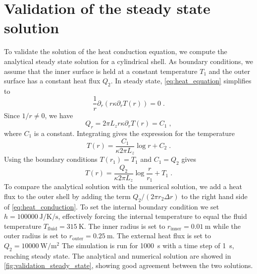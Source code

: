 \documentclass{article}
\begin{document}
\section{Validation of the steady state solution}
To validate the solution of the heat conduction equation, we compute the analytical steady state solution for a cylindrical shell. As boundary conditions, we assume that the inner surface is held at a constant temperature $T_{1}$ and the outer surface has a constant heat flux $Q_{2}$. In steady state, \cref{eq:heat_equation} simplifies to 
\begin{equation}
    \frac{1}{r}\partial_{r} \left( r \kappa \partial_{r} T\left( r \right) \right) = 0\;.
\end{equation}
Since $1/r \neq 0$, we have
\begin{equation}
  Q_{r} = 2 \pi L_{z} r \kappa \partial_{r} T\left( r \right) = C_{1}\;,
\end{equation}
where $C_{1}$ is a constant. Integrating gives the expression for the temperature
\begin{equation}
    T\left( r \right) = \frac{C_{1}}{\kappa 2\pi L_{z}} \log{r} + C_{2}\;.
\end{equation}
Using the boundary conditions $T\left( r_{1} \right) = T_{1}$ and $C_{1} = Q_{2}$ gives
\begin{equation}
    T\left( r \right) = \frac{Q_{2}}{\kappa 2\pi L_{z}} \log{\frac{r}{r_{1}}} + T_{1}\;.
\end{equation}
To compare the analytical solution with the numerical solution, we add a heat flux to the outer shell by adding the term $Q_{2} / (2 \pi r_{2} \Delta r)$ to the right hand side of \cref{eq:heat_conduction}. To set the internal boundary condition we set $h = \SI{100000}{\joule\per\kelvin\per\second}$, effectively forcing the internal temperature to equal the fluid temperature $T_{\text{fluid}} = \SI{315}{\kelvin}$. The inner radius is set to $r_{\text{inner}} = \SI{0.01}{\meter}$ while the outer radius is set to $r_{\text{outer}} = \SI{0.25}{\meter}$. 
The external heat flux is set to $Q_{2}= \SI{10000}{\watt\per\meter\squared}$
The simulation is run for \SI{1000}{\second} with a time step of \SI{1}{\second}, reaching steady state. The analytical and numerical solution are showed in \cref{fig:validation_steady_state}, showing good agreement between the two solutions.
\end{document}
